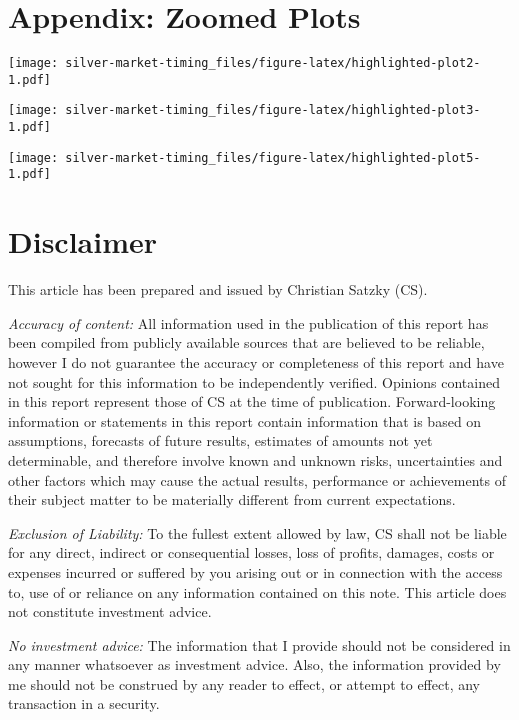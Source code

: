 \documentclass[
  12pt,
]{article}
\begin{document}
\hypertarget{appendix-zoomed-plots}{%
\section*{Appendix: Zoomed Plots}\label{appendix-zoomed-plots}}

\texttt{[image: silver-market-timing\_files/figure-latex/highlighted-plot2-1.pdf]}

\texttt{[image: silver-market-timing\_files/figure-latex/highlighted-plot3-1.pdf]}

\texttt{[image: silver-market-timing\_files/figure-latex/highlighted-plot5-1.pdf]}

\newpage

\hypertarget{disclaimer}{%
\section*{Disclaimer}\label{disclaimer}}

This article has been prepared and issued by Christian Satzky (CS).

\emph{Accuracy of content:} All information used in the publication of
this report has been compiled from publicly available sources that are
believed to be reliable, however I do not guarantee the accuracy or
completeness of this report and have not sought for this information to
be independently verified. Opinions contained in this report represent
those of CS at the time of publication. Forward-looking information or
statements in this report contain information that is based on
assumptions, forecasts of future results, estimates of amounts not yet
determinable, and therefore involve known and unknown risks,
uncertainties and other factors which may cause the actual results,
performance or achievements of their subject matter to be materially
different from current expectations.

\emph{Exclusion of Liability:} To the fullest extent allowed by law, CS
shall not be liable for any direct, indirect or consequential losses,
loss of profits, damages, costs or expenses incurred or suffered by you
arising out or in connection with the access to, use of or reliance on
any information contained on this note. This article does not constitute
investment advice.

\emph{No investment advice:} The information that I provide should not
be considered in any manner whatsoever as investment advice. Also, the
information provided by me should not be construed by any reader to
effect, or attempt to effect, any transaction in a security.
\end{document}
